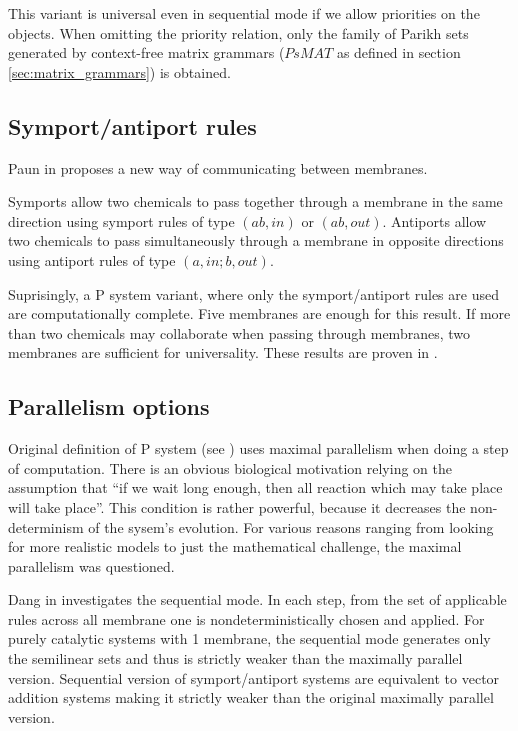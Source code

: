 This variant is universal even in sequential mode if we allow priorities on the objects. When omitting the priority relation, only the family of Parikh sets generated by context-free matrix grammars ($PsMAT$ as defined in section \ref{sec:matrix_grammars}) is obtained.


\subsection{Symport/antiport rules} %
\label{sub:symport_antiport_rules}

Paun in \cite{Paun:2002:SymportAntiport} proposes a new way of communicating between membranes.

Symports allow two chemicals to pass together through a membrane in the same direction using symport rules of type $(ab,in)$ or $(ab,out)$.
Antiports allow two chemicals to pass simultaneously through a membrane in opposite directions using antiport rules of type $(a,in;b,out)$.

Suprisingly, a P system variant, where only the symport/antiport rules are used are computationally complete. Five membranes are enough for this result. If more than two chemicals may collaborate when passing through membranes, two membranes are sufficient for universality. These results are proven in \cite{Paun:2002:SymportAntiport}.


\subsection{Parallelism options} %
\label{sub:parallelism_options}

Original definition of P system (see \cite{Paun98}) uses maximal parallelism when doing a step of computation. There is an obvious biological motivation relying on the assumption that ``if we wait long enough, then all reaction which may take place will take place''. This condition is rather powerful, because it decreases the non-determinism of the sysem's evolution. For various reasons ranging from looking for more realistic models to just the mathematical challenge, the maximal parallelism was questioned.


Dang in \cite{Dang04Sequential} investigates the sequential mode. In each step, from the set of applicable rules across all membrane one is nondeterministically chosen and applied. For purely catalytic systems with 1 membrane, the sequential mode generates only the semilinear sets and thus is strictly weaker than the maximally parallel version.
Sequential version of symport/antiport systems are equivalent to vector addition systems making it strictly weaker than the original maximally parallel version.

